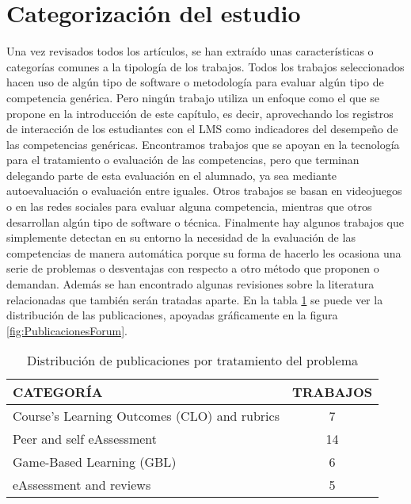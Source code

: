 \section{Categorización del estudio}

Una vez revisados todos los artículos, se han extraído unas características o categorías comunes a la tipología de los trabajos. Todos los trabajos seleccionados hacen uso de algún tipo de software o metodología para evaluar algún tipo de competencia genérica. Pero ningún trabajo utiliza un enfoque como el que se propone en la introducción de este capítulo, es decir, aprovechando los registros de interacción de los estudiantes con el LMS como indicadores del desempeño de las competencias genéricas. Encontramos trabajos que se apoyan en la tecnología para el tratamiento o evaluación de las competencias, pero que terminan delegando parte de esta evaluación en el alumnado, ya sea mediante autoevaluación o evaluación entre iguales. Otros trabajos se basan en videojuegos o en las redes sociales para evaluar alguna competencia, mientras que otros desarrollan algún tipo de software o técnica. Finalmente hay algunos trabajos que simplemente detectan en su entorno la necesidad de la evaluación de las competencias de manera automática porque su forma de hacerlo les ocasiona una serie de problemas o desventajas con respecto a otro método que proponen o demandan. Además se han encontrado algunas revisiones sobre la literatura relacionadas que también serán tratadas aparte.  En la tabla \ref{tab:PublicacionesForum} se puede ver la distribución de las publicaciones, apoyadas gráficamente en la figura  \ref{fig:PublicacionesForum}. 

\begin{table}[H]
  \begin{center}
  \begin{tabular}{| m{10cm} | c |}
    \hline
    CATEGORÍA & TRABAJOS\\
    \hline
    \hline 
    Course’s Learning Outcomes (CLO) and rubrics & 7\\
    \hline
    Peer and self eAssessment & 14\\
    \hline
    Game-Based Learning (GBL) & 6\\
    \hline
    eAssessment and reviews & 5\\
    \hline
  \end{tabular}
\end{center}
\caption{Distribución de publicaciones por tratamiento del problema}
\label{tab:PublicacionesForum}
\end{table} 

